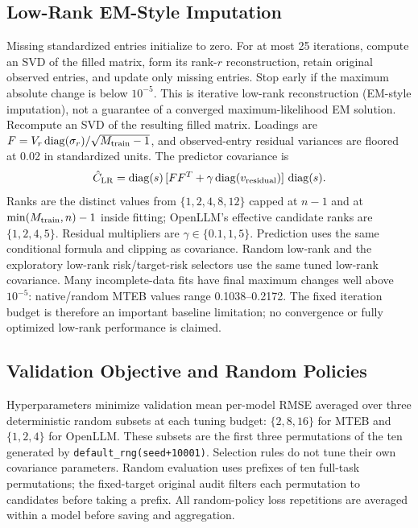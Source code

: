 \documentclass{article}
\begin{document}
\subsection{Low-Rank EM-Style Imputation}
Missing standardized entries initialize to zero. For at most 25 iterations, compute an SVD of the filled matrix, form its rank-$r$ reconstruction, retain original observed entries, and update only missing entries. Stop early if the maximum absolute change is below $10^{-5}$. This is iterative low-rank reconstruction (EM-style imputation), not a guarantee of a converged maximum-likelihood EM solution. Recompute an SVD of the resulting filled matrix. Loadings are $F=V_r\operatorname{diag}(\sigma_r)/\sqrt{M_{\rm train}-1}$, and observed-entry residual variances are floored at 0.02 in standardized units. The predictor covariance is
\begin{equation}
\hat C_{\rm LR}=\operatorname{diag}(s)\,[FF^T+\gamma\operatorname{diag}(v_{\rm residual})]\,\operatorname{diag}(s).
\end{equation}
Ranks are the distinct values from $\{1,2,4,8,12\}$ capped at $n-1$ and at $\min(M_{\rm train},n)-1$ inside fitting; OpenLLM's effective candidate ranks are $\{1,2,4,5\}$. Residual multipliers are $\gamma\in\{0.1,1,5\}$. Prediction uses the same conditional formula and clipping as covariance. Random low-rank and the exploratory low-rank risk/target-risk selectors use the same tuned low-rank covariance. Many incomplete-data fits have final maximum changes well above $10^{-5}$: native/random MTEB values range 0.1038--0.2172. The fixed iteration budget is therefore an important baseline limitation; no convergence or fully optimized low-rank performance is claimed.

\subsection{Validation Objective and Random Policies}
Hyperparameters minimize validation mean per-model RMSE averaged over three deterministic random subsets at each tuning budget: $\{2,8,16\}$ for MTEB and $\{1,2,4\}$ for OpenLLM. These subsets are the first three permutations of the ten generated by \texttt{default\_rng(seed+10001)}. Selection rules do not tune their own covariance parameters. Random evaluation uses prefixes of ten full-task permutations; the fixed-target original audit filters each permutation to candidates before taking a prefix. All random-policy loss repetitions are averaged within a model before saving and aggregation.
\end{document}
